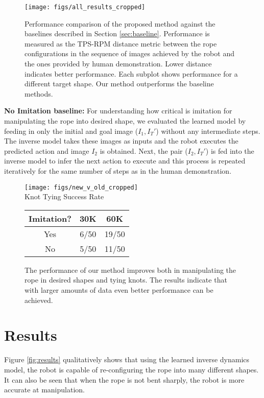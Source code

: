 \documentclass[letterpaper, 10 pt, conference]{ieeeconf}  %
\begin{document}
\begin{figure}%
    \centering
    \texttt{[image: figs/all\_results\_cropped]}
    \caption{Performance comparison of the proposed method against the baselines described in Section \ref{sec:baseline}. Performance is measured as the TPS-RPM distance metric between the rope configurations in the sequence of images achieved by the robot and the ones provided by human demonstration. Lower distance indicates better performance. Each subplot shows performance for a different target shape. Our method outperforms the baseline methods.}%
    \label{fig:trajerror}%
\end{figure}

\noindent \textbf{No Imitation baseline:} For understanding how critical is imitation for manipulating the rope into desired shape, we evaluated the learned model by feeding in only the initial and goal image ($I_1,I_T'$) without any intermediate steps. The inverse model takes these images as inputs and the robot executes the predicted action and image $I_2$ is obtained. Next, the pair ($I_2,I_T'$) is fed into the inverse model to infer the next action to execute and this process is repeated iteratively for the same number of steps as in the human demonstration.

\begin{figure}
    \centering
    \texttt{[image: figs/new\_v\_old\_cropped]}
    \\
    Knot Tying Success Rate
    
    \begin{tabular}{ | c || c | c |}
        \hline
        Imitation? & 30K & 60K  \\ \hline
        Yes & 6/50 & 19/50  \\ \hline
        No  & 5/50 & 11/50  \\ \hline
    \end{tabular}
    
    \caption{The performance of our method improves both in manipulating the rope in desired shapes and tying knots. The results indicate that with larger amounts of data even better performance can be achieved.}
    \label{fig:scaling}%
\end{figure}

\section{Results}
Figure \ref{fig:results} qualitatively shows that using the learned inverse dynamics model, the robot is capable of re-configuring the rope into many different shapes. It can also be seen that when the rope is not bent sharply, the robot is more accurate at manipulation. 
\end{document}
